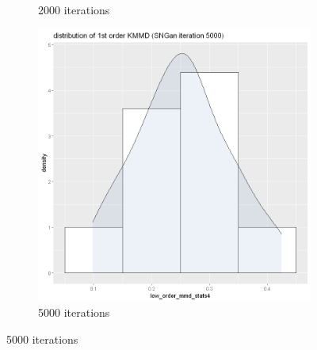 \documentclass{article}
\begin{document}
\begin{figure}[h!]
\begin{subfigure}[b]{0.3\textwidth}
         \caption{2000 iterations}
     \end{subfigure}
     \hfill
     \begin{subfigure}[b]{0.3\textwidth}
         \centering
         \includegraphics[width=\textwidth]{kmmd_figures/sngan_anime_lowdist_5000.png}
         \caption{5000 iterations}
     \end{subfigure}
\end{figure}

\newpage
\end{document}
